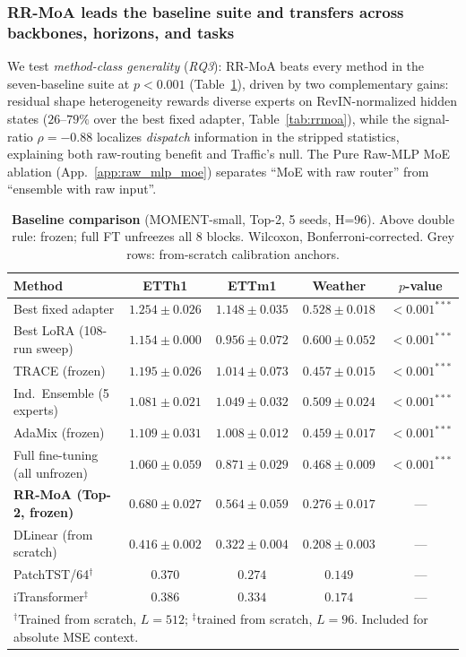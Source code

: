 \documentclass{article}
\begin{document}
\subsubsection*{RR-MoA leads the baseline suite and transfers across backbones, horizons, and tasks}

{ We test \emph{method-class generality} (\emph{RQ3}): RR-MoA beats every method in the seven-baseline suite at $p{<}0.001$ (Table~\ref{tab:baselines}), driven by two complementary gains: residual shape heterogeneity rewards diverse experts on RevIN-normalized hidden states ($26$--$79\%$ over the best fixed adapter, Table~\ref{tab:rrmoa}), while the signal-ratio $\rho{=}{-}0.88$ localizes \emph{dispatch} information in the stripped statistics, explaining both raw-routing benefit and Traffic's null. The Pure Raw-MLP MoE ablation (App.~\ref{app:raw_mlp_moe}) separates ``MoE with raw router'' from ``ensemble with raw input''.}

\begin{table}[!htbp]
\centering
\setlength{\tabcolsep}{3pt}
\renewcommand{\arraystretch}{0.80}
\caption{\textbf{Baseline comparison} (MOMENT-small, Top-2, 5 seeds, H=96). Above double rule: frozen; full FT unfreezes all 8 blocks. Wilcoxon, Bonferroni-corrected. Grey rows: from-scratch calibration anchors.}
\label{tab:baselines}
\footnotesize
\begin{tabular}{@{}lcccc@{}}
\toprule
Method & ETTh1 & ETTm1 & Weather & $p$-value \\
\midrule
Best fixed adapter & $1.254 \pm 0.026$ & $1.148 \pm 0.035$ & $0.528 \pm 0.018$ & ${<}0.001^{***}$ \\
Best LoRA (108-run sweep) & $1.154 \pm 0.000$ & $0.956 \pm 0.072$ & $0.600 \pm 0.052$ & ${<}0.001^{***}$ \\
TRACE (frozen) & $1.195 \pm 0.026$ & $1.014 \pm 0.073$ & $0.457 \pm 0.015$ & ${<}0.001^{***}$ \\
Ind.\ Ensemble (5 experts) & $1.081 \pm 0.021$ & $1.049 \pm 0.032$ & $0.509 \pm 0.024$ & ${<}0.001^{***}$ \\
AdaMix (frozen) & $1.109 \pm 0.031$ & $1.008 \pm 0.012$ & $0.459 \pm 0.017$ & ${<}0.001^{***}$ \\
\midrule
Full fine-tuning (all unfrozen) & $1.060 \pm 0.059$ & $0.871 \pm 0.029$ & $0.468 \pm 0.009$ & ${<}0.001^{***}$ \\
\midrule
\textbf{RR-MoA (Top-2, frozen)} & $\mathbf{0.680 \pm 0.027}$ & $\mathbf{0.564 \pm 0.059}$ & $\mathbf{0.276 \pm 0.017}$ & --- \\
\midrule
\rowcolor{gray!8} DLinear (from scratch) & $0.416 \pm 0.002$ & $0.322 \pm 0.004$ & $0.208 \pm 0.003$ & --- \\
\rowcolor{gray!8} PatchTST/64$^\dagger$~\citep{nie2023patchtst} & $0.370$ & $0.274$ & $0.149$ & --- \\
\rowcolor{gray!8} iTransformer$^\ddagger$~\citep{liu2024itransformer} & $0.386$ & $0.334$ & $0.174$ & --- \\
\bottomrule
\multicolumn{5}{l}{\scriptsize $^\dagger$Trained from scratch, $L{=}512$; $^\ddagger$trained from scratch, $L{=}96$. Included for absolute MSE context.}
\end{tabular}
\end{table}
\end{document}
